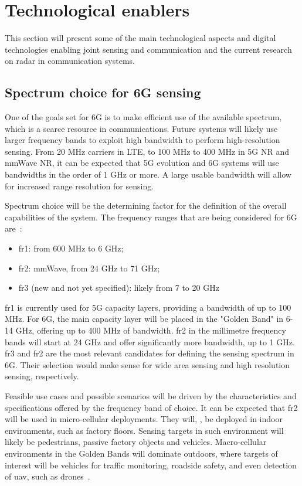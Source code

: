 \section{Technological enablers}

	This section will present some of the main technological aspects and digital technologies enabling joint sensing and communication and the current research on radar in communication systems.	
	
	\subsection{Spectrum choice for 6G sensing}

	One of the goals set for 6G is to make efficient use of the available spectrum, which is a scarce resource in communications.
	Future systems will likely use larger frequency bands to exploit high bandwidth to perform high-resolution sensing. From 20 MHz carriers in LTE, to 100 MHz to 400 MHz in 5G NR and mmWave \gls{NR}, it can be expected that \gls{5G} evolution and 6G systems will use bandwidths in the order of 1 GHz or more. A large usable bandwidth will allow for increased range resolution for sensing.
	
	Spectrum choice will be the determining factor for the definition of the overall capabilities of the system. The frequency ranges that are being considered for 6G are~\cite{Hexa}:
	
	\begin{itemize}
		\item \Gls{fr1}: from 600 MHz to 6 GHz;
		\item \Gls{fr2}: mmWave, from 24 GHz to 71 GHz;
		\item \gls{fr3} (new and not yet specified): likely from 7 to 20 GHz
	\end{itemize}
	
	\Gls{fr1} is currently used for \Gls{5G} capacity layers, providing a bandwidth of up to 100 MHz. For 6G, the main capacity layer will be placed in the "Golden Band" in 6-14 GHz, offering up to 400 MHz of bandwidth. \Gls{fr2} in the millimetre frequency bands will start at 24 GHz and offer significantly more bandwidth, up to 1 GHz.
	\Gls{fr3} and \Gls{fr2} are the most relevant candidates for defining the sensing spectrum in 6G. Their selection would make sense for wide area sensing and high resolution sensing, respectively.
	
	Feasible use cases and possible scenarios will be driven by the characteristics and specifications offered by the frequency band of choice. It can be expected that \Gls{fr2} will be used in micro-cellular deployments. They will, \eg, be deployed in indoor environments, such as factory floors. Sensing targets in such environment will likely be pedestrians, passive factory objects and vehicles.
	Macro-cellular environments in the Golden Bands will dominate outdoors, where targets of interest will be vehicles for traffic monitoring, roadside safety, and even detection of \gls{uav}, such as drones~\cite{Mandelli_Henninger_Bauhofer_Wild_2023}.
	
